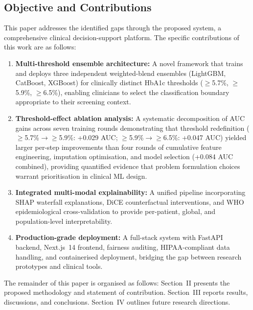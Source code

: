 \documentclass[conference]{IEEEtran}
\begin{document}
\subsection{Objective and Contributions}

This paper addresses the identified gaps through the proposed system, a comprehensive clinical decision-support platform. The specific contributions of this work are as follows:

\begin{enumerate}
    \item \textbf{Multi-threshold ensemble architecture:} A novel framework that trains and deploys three independent weighted-blend ensembles (LightGBM, CatBoost, XGBoost) for clinically distinct HbA1c thresholds ($\geq$5.7\%, $\geq$5.9\%, $\geq$6.5\%), enabling clinicians to select the classification boundary appropriate to their screening context.

    \item \textbf{Threshold-effect ablation analysis:} A systematic decomposition of AUC gains across seven training rounds demonstrating that threshold redefinition ($\geq$5.7\%$\rightarrow$$\geq$5.9\%: +0.029 AUC; $\geq$5.9\%$\rightarrow$$\geq$6.5\%: +0.047 AUC) yielded larger per-step improvements than four rounds of cumulative feature engineering, imputation optimisation, and model selection (+0.084 AUC combined), providing quantified evidence that problem formulation choices warrant prioritisation in clinical ML design.

    \item \textbf{Integrated multi-modal explainability:} A unified pipeline incorporating SHAP waterfall explanations, DiCE counterfactual interventions, and WHO epidemiological cross-validation to provide per-patient, global, and population-level interpretability.

    \item \textbf{Production-grade deployment:} A full-stack system with FastAPI backend, Next.js~14 frontend, fairness auditing, HIPAA-compliant data handling, and containerised deployment, bridging the gap between research prototypes and clinical tools.
\end{enumerate}

The remainder of this paper is organised as follows: Section~II presents the proposed methodology and statement of contribution. Section~III reports results, discussions, and conclusions. Section~IV outlines future research directions.

\end{document}
